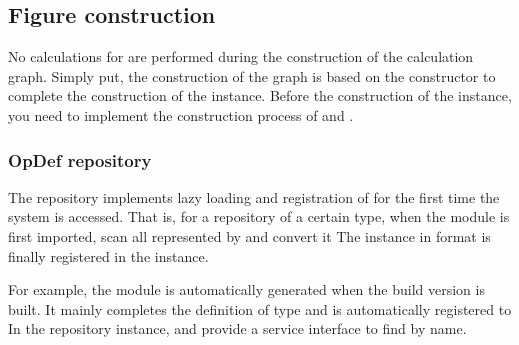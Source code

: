 \begin{content}


\subsection{Figure construction}

No calculations for  are performed during the construction of the calculation graph. Simply put, the construction of the graph is based on the  constructor to complete the construction of the  instance. Before the construction of the  instance, you need to implement the construction process of  and .

\subsubsection{OpDef repository}

The  repository implements lazy loading and registration of  for the first time the system is accessed. That is, for a  repository of a certain type, when the  module is first imported, scan all  represented by  and convert it The  instance in  format is finally registered in the  instance.

For example, the module  is automatically generated when the build version is built. It mainly completes the definition of  type  and is automatically registered to  In the repository instance, and provide a service interface to find  by name.


\end{content}
